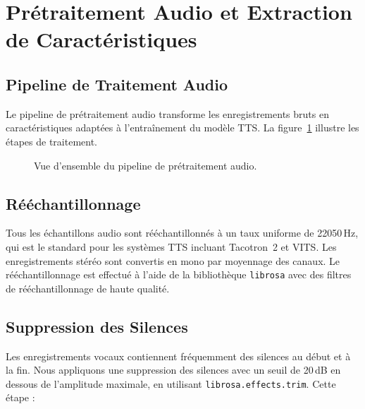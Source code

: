 \documentclass[12pt,a4paper]{article}
\begin{document}
\section{Prétraitement Audio et Extraction de Caractéristiques}
\label{sec:audio_preprocessing}

\subsection{Pipeline de Traitement Audio}

Le pipeline de prétraitement audio transforme les enregistrements bruts en caractéristiques adaptées à l'entraînement du modèle TTS. La figure~\ref{fig:audio_pipeline} illustre les étapes de traitement.

\begin{figure}[H]
\centering
{}
\caption{Vue d'ensemble du pipeline de prétraitement audio.}
\label{fig:audio_pipeline}
\end{figure}

\subsection{Rééchantillonnage}

Tous les échantillons audio sont rééchantillonnés à un taux uniforme de 22050\,Hz, qui est le standard pour les systèmes TTS incluant Tacotron~2 et VITS. Les enregistrements stéréo sont convertis en mono par moyennage des canaux. Le rééchantillonnage est effectué à l'aide de la bibliothèque \texttt{librosa} avec des filtres de rééchantillonnage de haute qualité.

\subsection{Suppression des Silences}

Les enregistrements vocaux contiennent fréquemment des silences au début et à la fin. Nous appliquons une suppression des silences avec un seuil de 20\,dB en dessous de l'amplitude maximale, en utilisant \texttt{librosa.effects.trim}. Cette étape :
\end{document}
